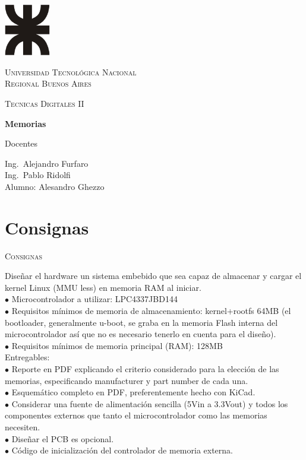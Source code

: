 \documentclass[12pt,a4paper]{report}
\makeatletter
\newcommand{\unchapter}[1]{%
  \begingroup
  \let\@makechapterhead\@gobble %
  \chapter{#1}
  \endgroup
}
\makeatother
\begin{document}
\begin{titlepage}
	\pagestyle{fancy}
	\centering
	\includegraphics[width=0.15\textwidth]{utn}\par\vspace{1cm}
	{\scshape\LARGE Universidad Tecnológica Nacional\\Regional Buenos Aires \par}
	\vspace{1cm}
	{\scshape\Large Tecnicas Digitales II\par}
	\vspace{1.5cm}
	{\huge\bfseries Memorias \par}
	\vspace{2cm}
	\begin{flushleft}
	Docentes\par
	Ing.~Alejandro Furfaro\\
	Ing.~Pablo Ridolfi\\
	\vfill
	Alumno:	Alesandro Ghezzo
	\vspace{2cm}
	\vfill
	\end{flushleft}
\end{titlepage}
\newpage
\tableofcontents
\newpage
\unchapter{Consignas}
{\center \large \scshape Consignas}\\ 
\begin{flushleft}
Diseñar el hardware un sistema embebido que sea capaz de almacenar y cargar el kernel Linux (MMU less) en memoria RAM al iniciar. \\ \vspace{0.1cm}
$\bullet$ Microcontrolador a utilizar: LPC4337JBD144 \\
$\bullet$ Requisitos mínimos de memoria de almacenamiento: kernel+rootfs 64MB (el bootloader, generalmente u-boot, se graba en la memoria Flash interna del microcontrolador así que no es necesario tenerlo en cuenta para el diseño).\\
$\bullet$ Requisitos mínimos de memoria principal (RAM): 128MB \\ \vspace{1cm}
Entregables:\\
$\bullet$ Reporte en PDF explicando el criterio considerado para la elección de las memorias, especificando manufacturer y part number de cada una. \\
$\bullet$ Esquemático completo en PDF, preferentemente hecho con KiCad.\\
$\bullet$ Considerar una fuente de alimentación sencilla (5Vin a 3.3Vout) y todos los componentes externos que tanto el microcontrolador como las memorias necesiten. \\ $\bullet$ Diseñar el PCB es opcional. \\
$\bullet$ Código de inicialización del controlador de memoria externa.\\
\end{flushleft}
\end{document}
